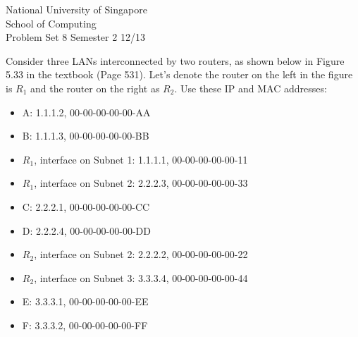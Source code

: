 \documentclass[a4paper,11pt,answers]{exam}
\begin{document}
    \extraheadheight{.5in}
    {\large\sf National University of Singapore\\ School of Computing \\
    \LARGE\sf Problem Set 8}%
    {\large\sf Semester 2 12/13}
    \firstpageheadrule
    \pagestyle{headandfoot}

    \begin{questions}

\question 
	Consider three LANs interconnected by two routers, as shown below in Figure 5.33 in the textbook 
	(Page 531).  Let's denote the router on the left in the figure is $R_1$ and the router on the right 
	as $R_2$.   Use these IP and MAC addresses:
	\begin{itemize}
		\item A: 1.1.1.2, 00-00-00-00-00-AA
		\item B: 1.1.1.3, 00-00-00-00-00-BB
		\item $R_1$, interface on Subnet 1: 1.1.1.1, 00-00-00-00-00-11
		\item $R_1$, interface on Subnet 2: 2.2.2.3, 00-00-00-00-00-33
		\item C: 2.2.2.1, 00-00-00-00-00-CC
		\item D: 2.2.2.4, 00-00-00-00-00-DD
		\item $R_2$, interface on Subnet 2: 2.2.2.2, 00-00-00-00-00-22
		\item $R_2$, interface on Subnet 3: 3.3.3.4, 00-00-00-00-00-44
		\item E: 3.3.3.1, 00-00-00-00-00-EE
		\item F: 3.3.3.2, 00-00-00-00-00-FF 
	\end{itemize}


\end{questions}
\end{document}

